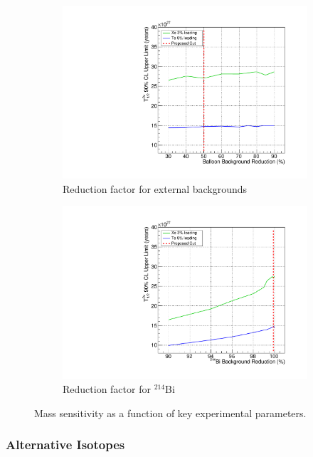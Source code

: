 \begin{figure}
\begin{subfigure}[b]{0.49\textwidth}
 \includegraphics[width=\textwidth]{dbd/externals_reduction_fc.pdf}
 \caption{Reduction factor for external backgrounds}
 \label{fig:scale-ext}
\end{subfigure}
\begin{subfigure}[b]{0.49\textwidth}
 \includegraphics[width=\textwidth]{dbd/bi214_reduction_fc.pdf}
 \caption{Reduction factor for $^{214}$Bi}
 \label{fig:scale-bi214}
\end{subfigure}
\caption{Mass sensitivity as a function of key experimental parameters.}
\label{fig:scaling-plots}
\end{figure}

\subsubsection{Alternative Isotopes}

